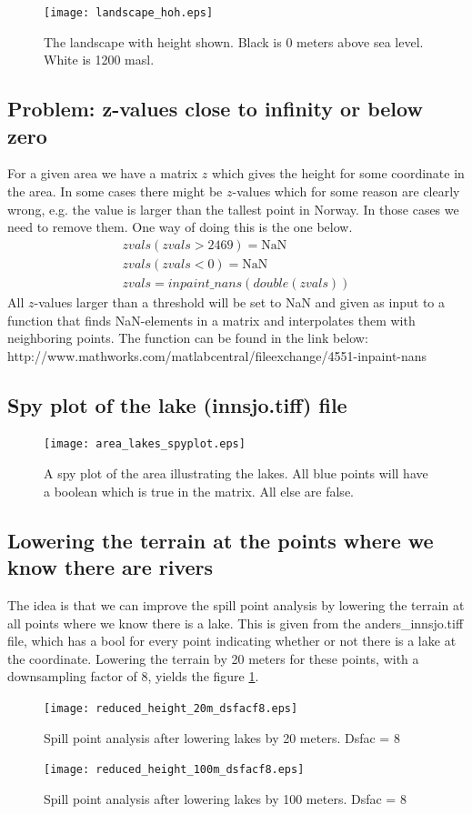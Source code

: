 \documentclass[10pt,a4paper]{article}
\begin{document}
\begin{figure}[H]
  \centering
    \texttt{[image: landscape\_hoh.eps]}
  \caption{The landscape with height shown. Black is 0 meters above sea level. White is 1200 masl.}
\end{figure}

\subsection{Problem: z-values close to infinity or below zero}
For a given area we have a matrix $z$ which gives the height for some coordinate in the area. In some cases there might be $z$-values which for some reason are clearly wrong, e.g. the value is larger than the tallest point in Norway. In those cases we need to remove them. One way of doing this is the one below.
\begin{align}
zvals(zvals > 2469) = \textrm{NaN}\\
zvals(zvals < 0) = \textrm{NaN}\\
zvals = inpaint\_nans(double(zvals))
\end{align}
All $z$-values larger than a threshold will be set to NaN and given as input to a function that finds NaN-elements in a matrix and interpolates them with neighboring points. The function can be found in the link below:\\
 http://www.mathworks.com/matlabcentral/fileexchange/4551-inpaint-nans

\subsection{Spy plot of the lake (innsjo.tiff) file}
\begin{figure}[h]
  \centering
    \texttt{[image: area\_lakes\_spyplot.eps]}
  \caption{A spy plot of the area illustrating the lakes. All blue points will have a boolean which is true in the matrix. All else are false.}
\end{figure}

\subsection{Lowering the terrain at the points where we know there are rivers}
The idea is that we can improve the spill point analysis by lowering the terrain at all points where we know there is a lake. This is given from the anders\_innsjo.tiff file, which has a bool for every point indicating whether or not there is a lake at the coordinate. Lowering the terrain by 20 meters for these points, with a downsampling factor of 8, yields the figure \ref{fig:lowered_20m_dsfac8}.

\begin{figure}[h]
\label{fig:lowered_20m_dsfac8} 
  \centering
    \texttt{[image: reduced\_height\_20m\_dsfacf8.eps]}
  \caption{Spill point analysis after lowering lakes by 20 meters. Dsfac = 8}
\end{figure}

\begin{figure}[h]
\label{fig:lowered_100m_dsfac8}
  \centering
    \texttt{[image: reduced\_height\_100m\_dsfacf8.eps]}
  \caption{Spill point analysis after lowering lakes by 100 meters. Dsfac = 8}
\end{figure}
\end{document}
